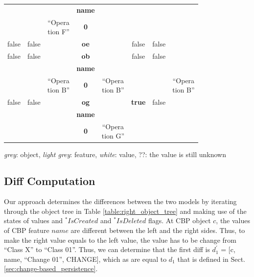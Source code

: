 \documentclass{llncs}
\begin{document}
\begin{table}
\begin{footnotesize}
\begin{tabular}{  c  c  c  c  c  c  c  c  }
            \rowcolor{gray2}
            & & & \textbf{\textsf{name}} & & & & \\
            & & \makecell{``Opera\\tion F''} & \textbf{0} & & & &  \\
            \hline
            \rowcolor{gray1}
            false & false & & \textbf{\textsf{oe}} & & false & false & \\
            \hline
            \rowcolor{gray1}
            false & false & & \textbf{\textsf{ob}} & & false & false & \\
            \rowcolor{gray2}
            & & & \textbf{\textsf{name}} & & & & \\
            & & \makecell{``Opera\\tion B''} & \textbf{0} & \makecell{``Opera\\tion B''} & & & \makecell{``Opera\\tion B''}\\
            \hline
            \rowcolor{gray1}
            false & false & & \textbf{\textsf{og}} & & \textbf{true} & false & \\
            \rowcolor{gray2}
            & & & \textbf{\textsf{name}} & & & & \\
            & &  & \textbf{0} & \makecell{``Opera\\tion G''} & & & \\
            \hline
        \end{tabular}
        \begin{flushright}
            \textit{grey}: object, \textit{light grey}: feature, \textit{white}: value, ??: the value is still unknown
        \end{flushright}
    \end{footnotesize}
\end{table}



\subsection{Diff Computation}
\label{sec:diff_computation}
Our approach determines the differences between the two models by iterating through the object tree in Table \ref{table:right_object_tree} and making use of the states of values and $^*IsCreated$ and $^*IsDeleted$ flags. At CBP object $c$, the values of CBP feature $name$ are different between the left and the right sides. Thus, to make the right value equals to the left value, the value has to be change from ``Class X'' to ``Class 01''. Thus, we can determine that the first diff is $d_1^\prime$ = [\textsf{c}, \textsf{name}, ``Change 01'', \textsf{CHANGE}], which as are equal to $d_1$ that is defined in Sect. \ref{sec:change-based_persistence}.
\end{document}
